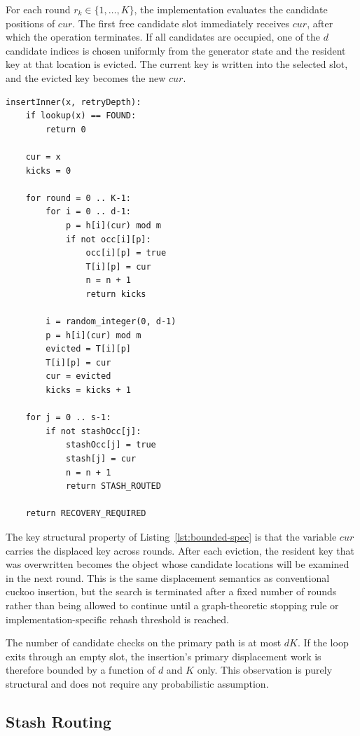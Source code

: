 \documentclass[conference]{IEEEtran}
\begin{document}
For each round $r_k\in\{1,\ldots,K\}$, the implementation evaluates the candidate positions of $cur$. The first free candidate slot immediately receives $cur$, after which the operation terminates. If all candidates are occupied, one of the $d$ candidate indices is chosen uniformly from the generator state and the resident key at that location is evicted. The current key is written into the selected slot, and the evicted key becomes the new $cur$.

\begin{lstlisting}[caption={Implementation-consistent pseudocode for bounded displacement},label={lst:bounded-spec}]
insertInner(x, retryDepth):
    if lookup(x) == FOUND:
        return 0

    cur = x
    kicks = 0

    for round = 0 .. K-1:
        for i = 0 .. d-1:
            p = h[i](cur) mod m
            if not occ[i][p]:
                occ[i][p] = true
                T[i][p] = cur
                n = n + 1
                return kicks

        i = random_integer(0, d-1)
        p = h[i](cur) mod m
        evicted = T[i][p]
        T[i][p] = cur
        cur = evicted
        kicks = kicks + 1

    for j = 0 .. s-1:
        if not stashOcc[j]:
            stashOcc[j] = true
            stash[j] = cur
            n = n + 1
            return STASH_ROUTED

    return RECOVERY_REQUIRED
\end{lstlisting}

The key structural property of Listing~\ref{lst:bounded-spec} is that the variable $cur$ carries the displaced key across rounds. After each eviction, the resident key that was overwritten becomes the object whose candidate locations will be examined in the next round. This is the same displacement semantics as conventional cuckoo insertion, but the search is terminated after a fixed number of rounds rather than being allowed to continue until a graph-theoretic stopping rule or implementation-specific rehash threshold is reached.

The number of candidate checks on the primary path is at most $dK$. If the loop exits through an empty slot, the insertion's primary displacement work is therefore bounded by a function of $d$ and $K$ only. This observation is purely structural and does not require any probabilistic assumption.

\subsection{Stash Routing}
\end{document}
